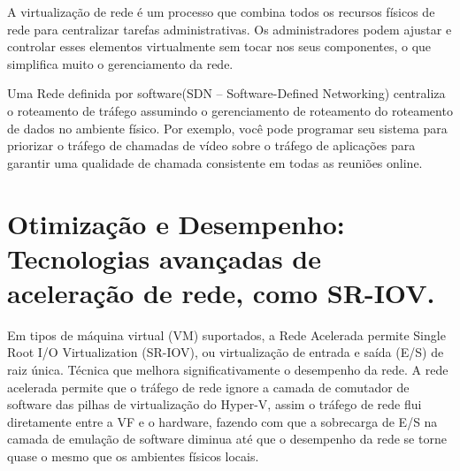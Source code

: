 \documentclass[a4paper, 12pt]{article}
\begin{document}
A virtualização de rede é um processo que combina todos os recursos físicos de rede para centralizar tarefas administrativas. Os administradores podem ajustar e controlar esses elementos virtualmente sem tocar nos seus componentes, o que simplifica muito o gerenciamento da rede.

Uma Rede definida por software(SDN – Software-Defined Networking) centraliza o roteamento de tráfego assumindo o gerenciamento de roteamento do roteamento de dados no ambiente físico. Por exemplo, você pode programar seu sistema para priorizar o tráfego de chamadas de vídeo sobre o tráfego de aplicações para garantir uma qualidade de chamada consistente em todas as reuniões online.


\section{Otimização e Desempenho: Tecnologias avançadas de aceleração de rede, como SR-IOV.} 

Em tipos de máquina virtual (VM) suportados, a Rede Acelerada permite Single Root I/O Virtualization (SR-IOV), ou virtualização de entrada e saída (E/S) de raiz única. Técnica que melhora significativamente o desempenho da rede. A rede acelerada permite que o tráfego de rede ignore a camada de comutador de software das pilhas de virtualização do Hyper-V, assim o tráfego de rede flui diretamente entre a VF e o hardware, fazendo com que a sobrecarga de E/S na camada de emulação de software diminua até que o desempenho da rede se torne quase o mesmo que os ambientes físicos locais.
\end{document}
